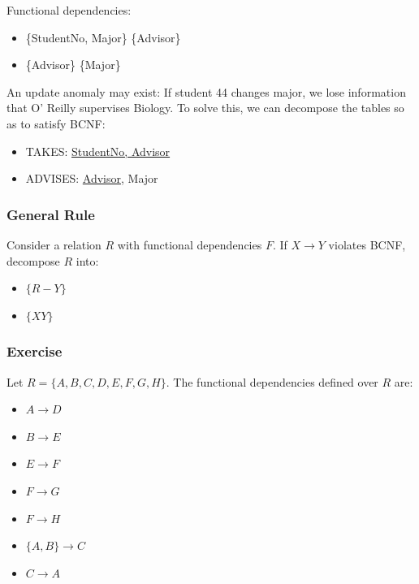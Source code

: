 \documentclass[a4paper,11pt]{article}
\begin{document}
Functional dependencies:
\begin{itemize}
    \item   \{StudentNo, Major\} {\rightarrow} \{Advisor\}
    \item   \{Advisor\} {\rightarrow} \{Major\}
\end{itemize}

An update anomaly may exist: If student 44 changes major, we lose information that O' Reilly supervises Biology.
To solve this, we can decompose the tables so as to satisfy BCNF: 
\begin{itemize}
    \item   TAKES: \underline{StudentNo, Advisor}
    \item   ADVISES: \underline{Advisor}, Major
\end{itemize}

\subsubsection{General Rule}
Consider a relation $R$ with functional dependencies $F$. 
If $X \rightarrow Y$ violates BCNF, decompose $R$ into:
\begin{itemize}
    \item   $\{R - Y\}$
    \item   $\{XY\}$
\end{itemize}

\subsubsection{Exercise}
Let $R = \{A, B, C, D, E, F, G, H\}$.
The functional dependencies defined over $R$ are:
\begin{itemize}
    \item   $A \rightarrow D$
    \item   $B \rightarrow E$
    \item   $E \rightarrow F$
    \item   $F \rightarrow G$
    \item   $F \rightarrow H$
    \item   $\{A, B\} \rightarrow C$
    \item   $C \rightarrow A$
\end{itemize}


\end{document}
